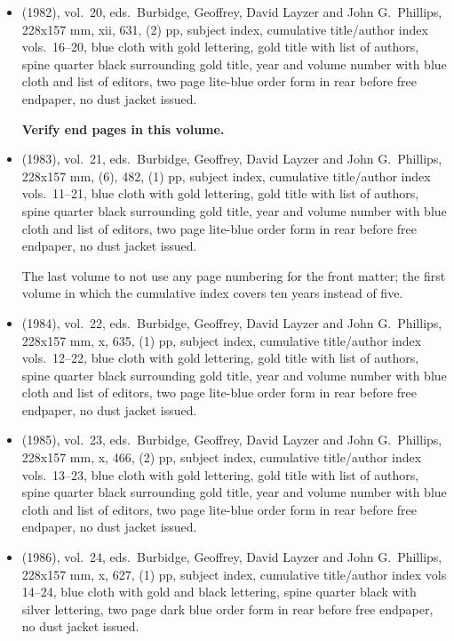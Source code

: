 \begin{itemize}
	\item (1982), vol.\ 20, eds.\ Burbidge, Geoffrey, David Layzer and John G.\ Phillips, 228x157 mm,
	xii, 631, (2) pp, subject index, cumulative title/author index vols.\ 16--20,
	blue cloth with gold lettering, gold title with list of authors,
  spine quarter black surrounding gold title, year and volume number with blue cloth and list of
  editors, two page lite-blue order form in rear before free endpaper, no dust jacket issued.
  
  \textbf{Verify end pages in this volume.}
  
	\item (1983), vol.\ 21, eds.\ Burbidge, Geoffrey, David Layzer and John G.\ Phillips, 228x157 mm,
	(6), 482, (1) pp, subject index, cumulative title/author index vols.\ 11--21,
	blue cloth with gold lettering, gold title with list of authors,
  spine quarter black surrounding gold title, year and volume number with blue cloth and list of
  editors, two page lite-blue order form in rear before free endpaper, no dust jacket issued.
  
  The last volume to not use any page numbering for the front matter; the first volume in which
  the cumulative index covers ten years instead of five.
  
	\item (1984), vol.\ 22, eds.\ Burbidge, Geoffrey, David Layzer and John G.\ Phillips, 228x157 mm,
	x, 635, (1) pp, subject index, cumulative title/author index vols.\ 12--22,
	blue cloth with gold lettering, gold title with list of authors,
  spine quarter black surrounding gold title, year and volume number with blue cloth and list of
  editors, two page lite-blue order form in rear before free endpaper, no dust jacket issued.
  
	\item (1985), vol.\ 23, eds.\ Burbidge, Geoffrey, David Layzer and John G.\ Phillips, 228x157 mm,
	x, 466, (2) pp, subject index, cumulative title/author index vols.\ 13--23,
	blue cloth with gold lettering, gold title with list of authors,
  spine quarter black surrounding gold title, year and volume number with blue cloth and list of
  editors, two page lite-blue order form in rear before free endpaper, no dust jacket issued.

	\item (1986), vol.\ 24, eds.\ Burbidge, Geoffrey, David Layzer and John G.\ Phillips, 228x157 mm,
	x, 627, (1) pp, subject index, cumulative title/author index vols 14--24,
	blue cloth with gold and black lettering, spine quarter black with silver lettering,
	two page dark blue order form in rear before free endpaper, no dust jacket issued.


\end{itemize}
